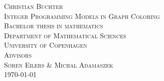 \clearpage
\thispagestyle{empty}

\begin{titlingpage}
	\vspace*{5.5cm}
	\noindent
	{\large\textsc{Christian Buchter}}\\[0.5cm]
	{\large\textsc{Integer Programming Models in Graph Coloring}}\\[0.1cm]
	\vfill\noindent
	{\large\textsc{Bachelor thesis in mathematics}}\\[0.2cm]
	\noindent
	{\large\textsc{Department of Mathematical Sciences}}\\[0.2cm]
	\noindent
	{\large\textsc{University of Copenhagen}}\\[1cm]
	{\large\textsc{Advisors \\[0.2cm] {\Large Søren Eilers \& Michal Adamaszek}}}\\[1cm]
	{\large\textsc{\today}}
	\let\cleardoublepage\clearpage
\end{titlingpage}
\normalfont
\restoregeometry
\cleardoublepage